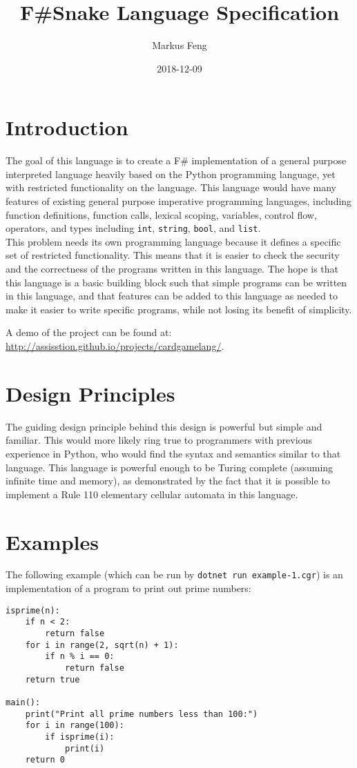 \documentclass{article}
\title{F\#Snake Language Specification}
\author{Markus Feng}
\date{2018-12-09}
\begin{document}
\maketitle

\section{Introduction}
The goal of this language is to create a F\# implementation of a general purpose interpreted language heavily based on the Python programming language, yet with restricted functionality on the language. This language would have many features of existing general purpose imperative programming languages, including function definitions, function calls, lexical scoping, variables, control flow, operators, and types including \texttt{int}, \texttt{string}, \texttt{bool}, and \texttt{list}. \\

This problem needs its own programming language because it defines a specific set of restricted functionality. This means that it is easier to check the security and the correctness of the programs written in this language. The hope is that this language is a basic building block such that simple programs can be written in this language, and that features can be added to this language as needed to make it easier to write specific programs, while not losing its benefit of simplicity.

A demo of the project can be found at:\\ \url{http://assisstion.github.io/projects/cardgamelang/}. 

\section{Design Principles}
The guiding design principle behind this design is powerful but simple and familiar. This would more likely ring true to programmers with previous experience in Python, who would find the syntax and semantics similar to that language. This language is powerful enough to be Turing complete (assuming infinite time and memory), as demonstrated by the fact that it is possible to implement a Rule 110 elementary cellular automata in this language.

\section{Examples}
The following example (which can be run by \texttt{dotnet run example-1.cgr}) is an implementation of a program to print out prime numbers:
\begin{lstlisting}[style=fssnake]
isprime(n):
    if n < 2:
        return false
    for i in range(2, sqrt(n) + 1):
        if n % i == 0:
            return false
    return true

main():
    print("Print all prime numbers less than 100:")
    for i in range(100):
        if isprime(i):
            print(i)
    return 0
\end{lstlisting}
\end{document}
